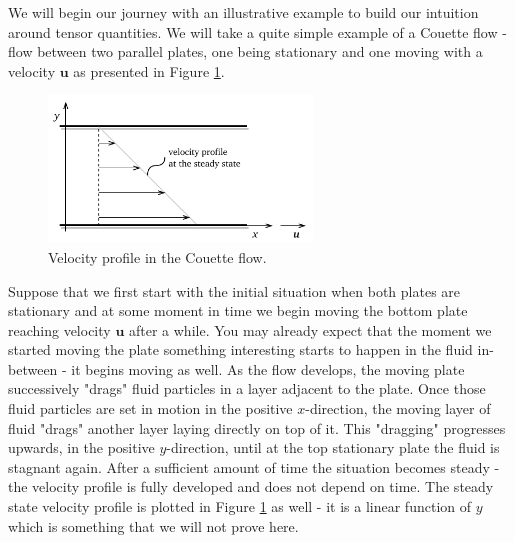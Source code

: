 \documentclass[10pt,twocolumn]{article}
\begin{document}
We will begin our journey with an illustrative example to build our intuition around tensor quantities. We will take a quite simple example of a Couette flow - flow between two parallel plates, one being stationary and one moving with a velocity $\mathbf{u}$ as presented in Figure \ref{fig:couette-flow}.
\begin{figure}[H]
\centering\includegraphics[width=7cm]{couette-flow.pdf}
\caption{Velocity profile in the Couette flow.}
\label{fig:couette-flow}
\end{figure}
Suppose that we first start with the initial situation when both plates are stationary and at some moment in time we begin moving the bottom plate reaching velocity $\mathbf{u}$ after a while. You may already expect that the moment we started moving the plate something interesting starts to happen in the fluid in-between - it begins moving as well. As the flow develops, the moving plate successively "drags" fluid particles in a layer adjacent to the plate. Once those fluid particles are set in motion in the positive $x$-direction, the moving layer of fluid "drags" another layer laying directly on top of it. This "dragging" progresses upwards, in the positive $y$-direction, until at the top stationary plate the fluid is stagnant again. After a sufficient amount of time the situation becomes steady - the velocity profile is fully developed and does not depend on time. The steady state velocity profile is plotted in Figure \ref{fig:couette-flow} as well - it is a linear function of $y$ which is something that we will not prove here.
\end{document}
